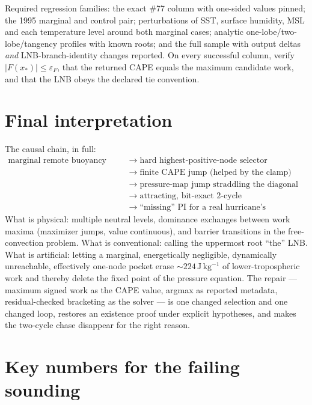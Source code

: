 \documentclass[11pt,a4paper]{article}
\theoremstyle{definition}
\newcommand{\Jkg}{\,\mathrm{J\,kg^{-1}}}
\begin{document}
Required regression families: the exact \#77 column with one-sided values
pinned; the 1995 marginal and control pair; perturbations of SST, surface
humidity, MSL and each temperature level around both marginal cases;
analytic one-lobe/two-lobe/tangency profiles with known roots; and the full
sample with output deltas \emph{and} LNB-branch-identity changes reported.
On every successful column, verify $|F(x_*)|\le\varepsilon_F$, that the
returned CAPE equals the maximum candidate work, and that the LNB obeys the
declared tie convention.

\section{Final interpretation}

The causal chain, in full:
\begin{align*}
\text{marginal remote buoyancy pocket}
&\;\longrightarrow\; \text{hard highest-positive-node selector}\\
&\;\longrightarrow\; \text{finite CAPE jump (helped by the clamp)}\\
&\;\longrightarrow\; \text{pressure-map jump straddling the diagonal}\\
&\;\longrightarrow\; \text{attracting, bit-exact 2-cycle}\\
&\;\longrightarrow\; \text{``missing'' PI for a real hurricane's
counterfactual.}
\end{align*}
What is physical: multiple neutral levels, dominance exchanges between work
maxima (maximizer jumps, value continuous), and barrier transitions in the
free-convection problem.  What is conventional: calling the uppermost root
``the'' LNB.  What is artificial: letting a marginal, energetically
negligible, dynamically unreachable, effectively one-node pocket erase
$\sim224\Jkg$ of lower-tropospheric work and thereby delete the fixed point
of the pressure equation.  The repair --- maximum signed work as the CAPE
value, argmax as reported metadata, residual-checked bracketing as the
solver --- is one changed selection and one changed loop, restores an
existence proof under explicit hypotheses, and makes the two-cycle chase
disappear for the right reason.

\appendix

\section{Key numbers for the failing sounding}
\end{document}
